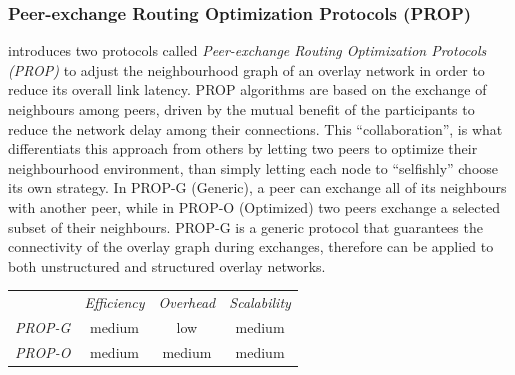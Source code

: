 \subsubsection{Peer-exchange Routing Optimization Protocols (PROP)}
\cite{qiu_prop_2007} introduces two protocols called \emph{Peer-exchange Routing
Optimization Protocols (PROP)} to adjust the neighbourhood graph of an overlay
network in order to reduce its overall link latency. PROP algorithms are based
on the exchange of neighbours among peers, driven by the mutual benefit of the
participants to reduce the network delay among their connections. This
``collaboration'', is what differentiats this approach from others by letting
two peers to optimize their neighbourhood environment, than simply letting each
node to ``selfishly'' choose its own strategy. In PROP-G (Generic), a peer can
exchange all of its neighbours with another peer, while in PROP-O (Optimized)
two peers exchange a selected subset of their neighbours. PROP-G is a generic
protocol that guarantees the connectivity of the overlay graph during exchanges,
therefore can be applied to both unstructured and structured overlay networks.

\begin{center}
\begin{tabular}{rccc}
\multicolumn{1}{r}{} &
\multicolumn{1}{c}{\emph{Efficiency}} &
\multicolumn{1}{c}{\emph{Overhead}} &
\multicolumn{1}{c}{\emph{Scalability}}
\\
\cline{2-4}
\emph{PROP-G} &
medium &
low &
medium \\
\emph{PROP-O} &
medium &
medium &
medium \\
\end{tabular}
\end{center}


